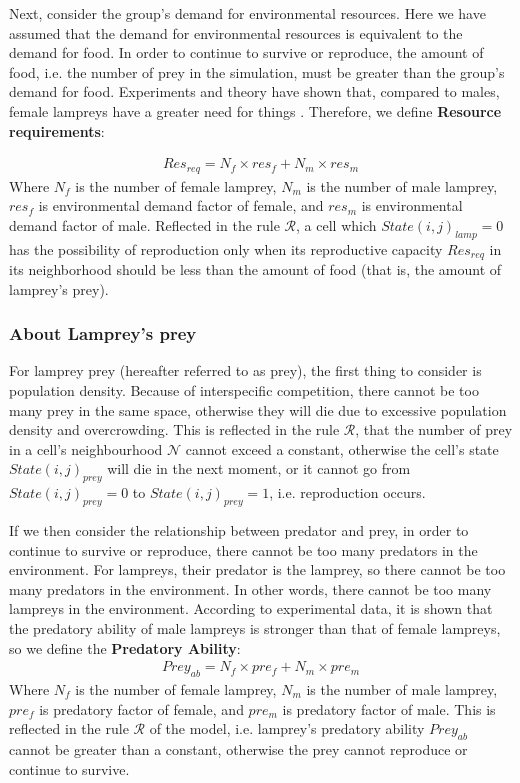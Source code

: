 \documentclass{mcmthesis}
\begin{document}
 Next, consider the group's demand for environmental resources. Here we have assumed that the demand for environmental resources is equivalent to the demand for food. In order to continue to survive or reproduce, the amount of food, i.e. the number of prey in the simulation, must be greater than the group's demand for food. Experiments and theory have shown that, compared to males, female lampreys have a greater need for things \cite{2}. Therefore, we define \textbf{Resource requirements}:

\begin{align}
Res_{req} = N_f \times res_f + N_m \times res_m
\end{align}
 Where $N_f$ is the number of female lamprey, $N_m$ is the number of male lamprey, $res_f$ is environmental demand factor of female, and $res_m$ is environmental demand factor of male. Reflected in the rule ${\displaystyle {\mathcal {R}}}$, a cell which $State(i,j)_{lamp} = 0$ has the possibility of reproduction only when its reproductive capacity $Res_{req}$ in its neighborhood should be less than the amount of food (that is, the amount of lamprey's prey).

\subsubsection{About Lamprey's prey}

For lamprey prey (hereafter referred to as prey), the first thing to consider is population density. Because of interspecific competition, there cannot be too many prey in the same space, otherwise they will die due to excessive population density and overcrowding. This is reflected in the rule ${\displaystyle {\mathcal {R}}}$, that the number of prey in a cell's neighbourhood ${\displaystyle {\mathcal {N}}}$ cannot exceed a constant, otherwise the cell's state $State(i,j)_{prey}$ will die in the next moment, or it cannot go from $State(i,j)_{prey}= 0$ to $State(i,j)_{prey}= 1$, i.e. reproduction occurs.

If we then consider the relationship between predator and prey, in order to continue to survive or reproduce, there cannot be too many predators in the environment. For lampreys, their predator is the lamprey, so there cannot be too many predators in the environment. In other words, there cannot be too many lampreys in the environment. According to experimental data, it is shown that the predatory ability of male lampreys is stronger than that of female lampreys, so we define the \textbf{Predatory Ability}:
\begin{align}
Prey_{ab} = N_f \times pre_f + N_m \times pre_m
\end{align}
Where $N_f$ is the number of female lamprey, $N_m$ is the number of male lamprey, $pre_f$ is predatory factor of female, and $pre_m$ is predatory factor of male. This is reflected in the rule ${\displaystyle {\mathcal {R}}}$ of the model, i.e. lamprey’s predatory ability $Prey_{ab}$ cannot be greater than a constant, otherwise the prey cannot reproduce or continue to survive.
\end{document}
